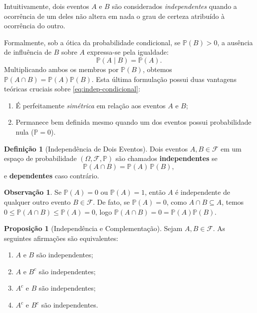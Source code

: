 \documentclass[12pt,portuguese]{article}
\let\le\leqslant
\theoremstyle{definition}
\newtheorem{definition}[definition]{Definição}
\newtheorem{proposition}[proposition]{Proposição}
\newtheorem{remark}[remark]{Observação}
\begin{document}
Intuitivamente, dois eventos \(A\) e \(B\) são considerados \emph{independentes} quando a ocorrência de um deles não altera em nada o grau de certeza atribuído à ocorrência do outro.

Formalmente, sob a ótica da probabilidade condicional, se \(\mathbb{P}(B) > 0\), a ausência de influência de \(B\) sobre \(A\) expressa-se pela igualdade:
\begin{equation}\label{eq:indep-condicional}
  \mathbb{P}(A \mid B) = \mathbb{P}(A).
\end{equation}
Multiplicando ambos os membros por \(\mathbb{P}(B)\), obtemos \(\mathbb{P}(A \cap B) = \mathbb{P}(A)\mathbb{P}(B)\). Esta última formulação possui duas vantagens teóricas cruciais sobre \eqref{eq:indep-condicional}:
\begin{enumerate}[label=(\roman*)]
  \item É perfeitamente \emph{simétrica} em relação aos eventos \(A\) e \(B\);
  \item Permanece bem definida mesmo quando um dos eventos possui probabilidade nula (\(\mathbb{P} = 0\)).
\end{enumerate}

\begin{definition}[Independência de Dois Eventos]\label{def:independencia}
Dois eventos \(A, B \in \mathcal{F}\) em um espaço de probabilidade \((\Omega, \mathcal{F}, \mathbb{P})\) são chamados \textbf{independentes} se
\begin{equation}\label{eq:independencia}
  \mathbb{P}(A \cap B) = \mathbb{P}(A)\,\mathbb{P}(B),
\end{equation}
e \textbf{dependentes} caso contrário.
\end{definition}

\begin{remark}
Se \(\mathbb{P}(A) = 0\) ou \(\mathbb{P}(A) = 1\), então \(A\) é independente de qualquer outro evento \(B \in \mathcal{F}\). De fato, se \(\mathbb{P}(A) = 0\), como \(A \cap B \subseteq A\), temos \(0 \le \mathbb{P}(A \cap B) \le \mathbb{P}(A) = 0\), logo \(\mathbb{P}(A \cap B) = 0 = \mathbb{P}(A)\mathbb{P}(B)\).
\end{remark}

\begin{proposition}[Independência e Complementação]\label{prop:indep-complementares}
Sejam \(A, B \in \mathcal{F}\). As seguintes afirmações são equivalentes:
\begin{enumerate}[label=(\alph*)]
  \item \(A\) e \(B\) são independentes;
  \item \(A\) e \(B^c\) são independentes;
  \item \(A^c\) e \(B\) são independentes;
  \item \(A^c\) e \(B^c\) são independentes.
\end{enumerate}
\end{proposition}
\end{document}
